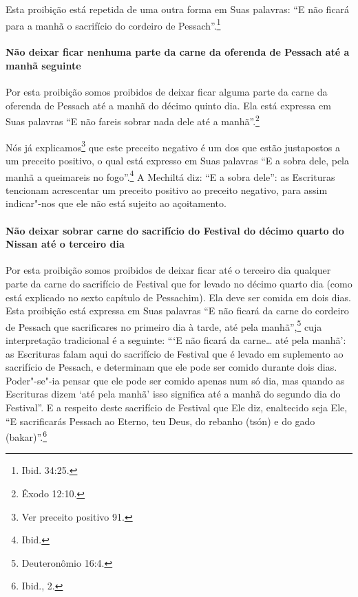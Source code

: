 \begin{multicols}{2}
Esta proibição está repetida de uma outra forma em Suas palavras: ``E
não ficará para a manhã o sacrifício do cordeiro de Pessach\starr''.\footnote{Ibid.
34:25.}

\paragraph{Não deixar ficar nenhuma parte da carne da oferenda
de Pessach\starr{} até a manhã seguinte}

Por esta proibição somos proibidos de deixar ficar alguma parte da carne
da oferenda de Pessach\starr{} até a manhã do décimo quinto dia. Ela está
expressa em Suas palavras ``E não fareis sobrar nada dele até a manhã''.\footnote{Êxodo 12:10.}

Nós já explicamos\footnote{Ver preceito positivo 91.} que este preceito negativo é um
dos que estão justapostos a um preceito positivo, o qual está expresso
em Suas palavras ``E a sobra dele, pela manhã a queimareis no fogo''.\footnote{Ibid.} A Mechiltá\starr{} diz: ``E a sobra dele'': as Escrituras tencionam
acrescentar um preceito positivo ao preceito negativo, para assim
indicar"-nos que ele não está sujeito ao açoitamento.

\paragraph{Não deixar sobrar carne do sacrifício do Festival do décimo quarto
do Nissan\starr{} até o terceiro dia}

Por esta proibição somos proibidos de deixar ficar até o terceiro dia
qualquer parte da carne do sacrifício de Festival que for levado no
décimo quarto dia (como está explicado no sexto capítulo de Pessachim\starr).
Ela deve ser comida em dois dias. Esta proibição está expressa em Suas
palavras ``E não ficará da carne do cordeiro de Pessach\starr{} que
sacrificares no primeiro dia à tarde, até pela manhã'',\footnote{Deuteronômio
16:4.} cuja interpretação tradicional é a seguinte: ```E não ficará da
carne\ldots{} até pela manhã': as Escrituras falam aqui do sacrifício de
Festival que é levado em suplemento ao sacrifício de Pessach\starr, e
determinam que ele pode ser comido durante dois dias. Poder"-se"-ia pensar
que ele pode ser
comido apenas num só dia, mas quando as Escrituras dizem `até pela
manhã' isso significa até a manhã do segundo dia do Festival''. E a
respeito deste sacrifício de Festival que Ele diz, enaltecido seja Ele,
``E sacrificarás Pessach\starr{} ao Eterno, teu Deus, do rebanho (tsón\starr) e do
gado (bakar\starr)''.\footnote{Ibid., 2.}


\end{multicols}
